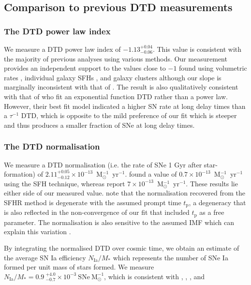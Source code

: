 \documentclass[fleqn,usenatbib]{mnras}
\begin{document}
\subsection{Comparison to previous DTD measurements \label{subsec:compare_dtd}}

\subsubsection{The DTD power law index \label{subsubsec:compare_beta}}
We measure a DTD power law index of $-1.13^{+0.04}_{-0.06}$. This value is consistent with the majority of previous analyses using various methods. Our measurement provides an independent support to the values close to $-1$ found using volumetric rates \citep[e.g.][]{Graur2011,Graur2014,Frohmaier2019}, individual galaxy SFHs \citep[e.g.][]{Maoz2012,Graur2013}, and galaxy clusters \citep[e.g.][]{Maoz2010} although our slope is marginally inconsistent with that of \citet{Heringer2019}. The result is also qualitatively consistent with that of \citet{Strolger2020a} who fit an exponential function DTD rather than a power law. However, their best fit model indicated a higher SN rate at long delay times than a $\tau^{-1}$ DTD, which is opposite to the mild preference of our fit which is steeper and thus produces a smaller fraction of SNe at long delay times.

\subsubsection{The DTD normalisation \label{subsubsec:compare_A}}
We measure a DTD normalisation (i.e. the rate of SNe 1 Gyr after star-formation) of $2.11^{+0.05}_{-0.12} \times 10^{-13}$~M$_{\odot}^{-1}$~yr$^{-1}$. \citet{Graur2013} found a value of $0.7 \times 10^{-13}$~M$_{\odot}^{-1}$~yr$^{-1}$ using the SFH technique, whereas \citet{Heringer2019} report $7 \times 10^{-13}$~M$_{\odot}^{-1}$~yr$^{-1}$. These results lie either side of our measured value. \citet{Heringer2019} note that the normalisation recovered from the SFHR method is degenerate with the assumed prompt time $t_{\mathrm{p}}$, a degeneracy that is also reflected in the non-convergence of our fit that included $t_{\mathrm{p}}$ as a free parameter. The normalisation is also sensitive to the assumed IMF which can explain this variation \citep{Maoz2017}. 

By integrating the normalised DTD over cosmic time, we obtain an estimate of the average SN Ia efficiency $N_{\mathrm{Ia}}/M_*$ which represents the number of SNe Ia formed per unit mass of stars formed. We measure $N_{\mathrm{Ia}}/M_* = 0.9~_{-0.7}^{+4.0} \times 10^{-3}~\mathrm{SNe}~\mathrm{M}_{\odot}^{-1}$, which is consistent with \citet{Graur2011}, \citet{Maoz2011}, \citet{Perrett2012}, and \citet{Graur2013}
\end{document}
